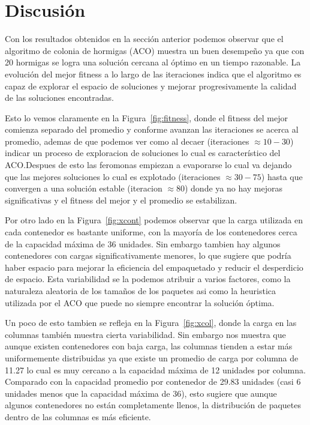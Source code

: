 \section{Discusión}

Con los resultados obtenidos en la sección anterior podemos observar que el 
algoritmo de colonia de hormigas (ACO) muestra un buen desempeño ya que con 20 hormigas
se logra una solución cercana al óptimo en un tiempo razonable. La evolución del 
mejor fitness a lo largo de las iteraciones indica que el algoritmo es capaz de 
explorar el espacio de soluciones y mejorar progresivamente la calidad de las 
soluciones encontradas.

Esto lo vemos claramente en la Figura~\ref{fig:fitness}, donde el fitness del mejor
comienza separado del promedio y conforme avanzan las iteraciones se acerca al promedio,
ademas de que podemos ver como al decaer (iteraciones $\approx10-30$) indicar un proceso de exploracion de soluciones
lo cual es característico del ACO.Despues de esto las feromonas empiezan a evaporarse
lo cual va dejando que las mejores soluciones lo cual es explotado (iteraciones $\approx30-75$)
hasta que convergen a una solución estable (iteracion $\approx80$) donde ya no hay mejoras significativas
y el fitness del mejor y el promedio se estabilizan.

Por otro lado en la Figura~\ref{fig:xcont} podemos observar que la carga utilizada en cada contenedor
es bastante uniforme, con la mayoría de los contenedores cerca de la capacidad máxima de 36 unidades.
Sin embargo tambien hay algunos contenedores con cargas significativamente menores, lo que sugiere que
podría haber espacio para mejorar la eficiencia del empaquetado y reducir el desperdicio de espacio.
Esta variabilidad se la podemos atribuir a varios factores, como la naturaleza aleatoria de los tamaños
de los paquetes asi como la heuristica utilizada por el ACO que puede no siempre encontrar la solución óptima.

Un poco de esto tambien se refleja en la Figura~\ref{fig:xcol}, donde la carga en las columnas también muestra 
cierta variabilidad. Sin embargo nos muestra que aunque existen contenedores con baja carga, las columnas 
tienden a estar más uniformemente distribuidas ya que existe un promedio de carga por columna de 11.27
lo cual es muy cercano a la capacidad máxima de 12 unidades por columna. Comparado con la capacidad
promedio por contenedor de 29.83 unidades (casi 6 unidades menos que la capacidad máxima de 36), esto sugiere que aunque algunos contenedores no están completamente llenos,
la distribución de paquetes dentro de las columnas es más eficiente.